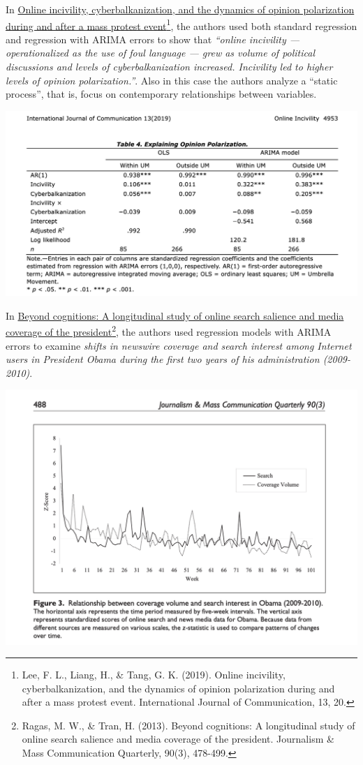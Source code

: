 \documentclass[
]{article}
\begin{document}
In \href{https://ijoc.org/index.php/ijoc/article/viewFile/11666/2819}{Online incivility, cyberbalkanization, and the dynamics of opinion polarization during and after a mass protest event}\footnote{Lee, F. L., Liang, H., \& Tang, G. K. (2019). Online incivility, cyberbalkanization, and the dynamics of opinion polarization during and after a mass protest event. International Journal of Communication, 13, 20.}, the authors used both standard regression and regression with ARIMA errors to show that \emph{``online incivility --- operationalized as the use of foul language --- grew as volume of political discussions and levels of cyberbalkanization increased. Incivility led to higher levels of opinion polarization.''}. Also in this case the authors analyze a ``static process'', that is, focus on contemporary relationships between variables.

\includegraphics[width=23.74in]{images/Online-Incivility}

In \href{https://journals.sagepub.com/doi/abs/10.1177/1077699013493792}{Beyond cognitions: A longitudinal study of online search salience and media coverage of the president}\footnote{Ragas, M. W., \& Tran, H. (2013). Beyond cognitions: A longitudinal study of online search salience and media coverage of the president. Journalism \& Mass Communication Quarterly, 90(3), 478-499.}, the authors used regression models with ARIMA errors to examine \emph{shifts in newswire coverage and search interest among Internet users in President Obama during the first two years of his administration (2009-2010)}.

\includegraphics[width=15.28in]{images/Beyond-Cognitions}
\end{document}
